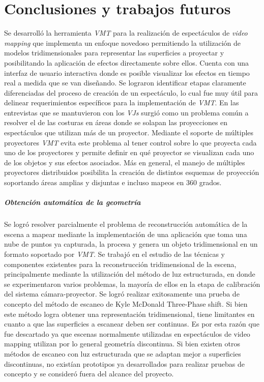 ﻿\chapter{Conclusiones y trabajos futuros}

Se desarrolló la herramienta \emph{VMT} para la realización de espectáculos de \emph{video mapping} que implementa un enfoque novedoso permitiendo la utilización de modelos tridimensionales para representar las superficies a proyectar y posibilitando la aplicación de efectos directamente sobre ellos. Cuenta con una interfaz de usuario interactiva donde es posible visualizar los efectos en tiempo real a medida que se van diseñando.
Se lograron identificar etapas claramente diferenciadas del proceso de creación de un espectáculo, lo cual fue muy útil para delinear requerimientos específicos para la implementación de \emph{VMT}. 
En las entrevistas que se mantuvieron con los \emph{VJs} surgió como un problema común a resolver el de las costuras en áreas donde se solapan las proyecciones en espectáculos que utilizan más de un proyector. Mediante el soporte de múltiples proyectores \emph{VMT} evita este problema al tener control sobre lo que proyecta cada uno de los proyectores y permite definir en qué proyector se visualizan cada uno de los objetos y sus efectos asociados. Más en general, el manejo de múltiples proyectores distribuidos posibilita la creación de distintos esquemas de proyección soportando áreas amplias y disjuntas e incluso mapeos en 360 grados.

\paragraph{Obtención automática de la geometría}

Se logró resolver parcialmente el problema de reconstrucción automática de la escena a mapear mediante la implementación de una aplicación que toma una nube de puntos ya capturada, la procesa y genera un objeto tridimensional en un formato soportado por \emph{VMT}.
Se trabajó en el estudio de las técnicas y componentes existentes para la reconstrucción tridimensional de la escena, principalmente mediante la utilización del método de luz estructurada, en donde se experimentaron varios problemas, la mayoría de ellos en la etapa de calibración del sistema cámara-proyector. 
Se logró realizar exitosamente una prueba de concepto del método de escaneo de Kyle McDonald  Three-Phase shift.
Si bien este método logra obtener una representación tridimensional, tiene limitantes en cuanto a que las superficies a escanear deben ser continuas. Es por esta razón que fue descartado ya que escenas normalmente utilizadas en espectáculos de video mapping utilizan por lo general geometría discontinua.
Si bien existen otros métodos de escaneo con luz estructurada que se adaptan mejor a superficies discontinuas, no existían prototipos ya desarrollados para realizar pruebas de concepto y se consideró fuera del alcance del proyecto.

